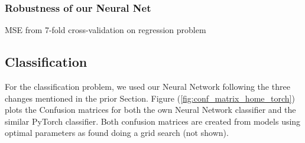 \documentclass
[twocolumn,
secnumarabic,
nobibnotes,
aps,
prl,
reprint,
groupedaddress,
amsmath,
amssymb
]{revtex4-2}
\begin{document}
\subsubsection{Robustness of our Neural Net}
\begin{table}
  \caption{\label{tab:cross_val_scores}MSE from 7-fold cross-validation on regression problem}
\end{table}

\subsection{Classification}

For the classification problem, we used our Neural Network following the three changes mentioned in the prior Section. Figure (\ref{fig:conf_matrix_home_torch}) plots the Confusion matrices for both the own Neural Network classifier and the similar PyTorch classifier. Both confusion matrices are created from models using optimal parameters as found doing a grid search (not shown).
\end{document}
